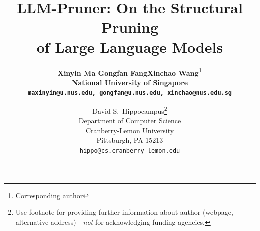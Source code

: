 \documentclass{article}
\title{LLM-Pruner: On the Structural Pruning \\ of Large Language Models}
\author{
\bf Xinyin Ma \quad Gongfan Fang\quad Xinchao Wang\thanks{Corresponding author}\\
{National University of Singapore} \\
{\tt\small  maxinyin@u.nus.edu,  gongfan@u.nus.edu,
xinchao@nus.edu.sg} \\
}
\author{%
  David S.~Hippocampus\thanks{Use footnote for providing further information
    about author (webpage, alternative address)---\emph{not} for acknowledging
    funding agencies.} \\
  Department of Computer Science\\
  Cranberry-Lemon University\\
  Pittsburgh, PA 15213 \\
  \texttt{hippo@cs.cranberry-lemon.edu} \\
}}\fi
\newcommand{\methodname}{LLM-Pruner}
\begin{document}
\maketitle


\begin{abstract}





\end{abstract}
\end{document}
